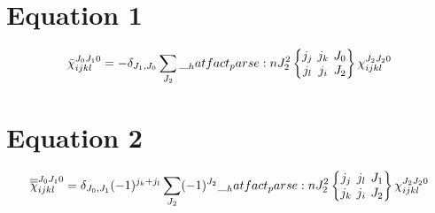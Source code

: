 \documentclass{scrartcl}
\newcommand{\sixj}[6]{\begingroup\setlength{\arraycolsep}{0.2em}\begin{Bmatrix} #1 & #2 & #3 \\ #4 & #5 & #6 \end{Bmatrix}\endgroup}
\begin{document}
\section{Equation 1}
\begin{dmath*}
\bar{\chi}_{i j k l}^{{J}_{0} {J}_{1} 0} = -\delta_{{J}_{1},{J}_{0}} \* \sum_{{J}_{2}} \* \hatfact{{J}_{2}^{2}} \* \sixj{{j}_{j}}{{j}_{k}}{{J}_{0}}{{j}_{l}}{{j}_{i}}{{J}_{2}} \* \chi_{i j k l}^{{J}_{2} {J}_{2} 0}
\end{dmath*}

\section{Equation 2}
\begin{dmath*}
\overline{\overline{\chi}}_{i j k l}^{{J}_{0} {J}_{1} 0} = \delta_{{J}_{0},{J}_{1}} \* (-1)^{{j}_{k}+{j}_{l}} \* \sum_{{J}_{2}} \* (-1)^{{J}_{2}} \* \hatfact{{J}_{2}^{2}} \* \sixj{{j}_{j}}{{j}_{l}}{{J}_{1}}{{j}_{k}}{{j}_{i}}{{J}_{2}} \* \chi_{i j k l}^{{J}_{2} {J}_{2} 0}
\end{dmath*}
\end{document}

